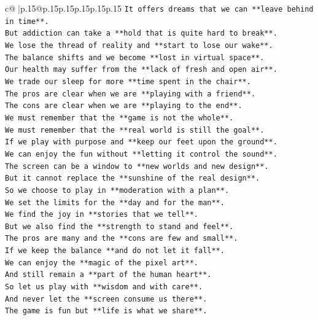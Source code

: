\documentclass{article}
\begin{document}
{\begin{supertabular}{c@{$\;$}|p{.15\linewidth}@{}p{.15\linewidth}p{.15\linewidth}p{.15\linewidth}p{.15\linewidth}p{.15\linewidth}}
{{{\texttt{It offers dreams that we can **leave behind in time**.} \\
\texttt{But addiction can take a **hold that is quite hard to break**.} \\
\texttt{We lose the thread of reality and **start to lose our wake**.} \\
\texttt{The balance shifts and we become **lost in virtual space**.} \\
\texttt{Our health may suffer from the **lack of fresh and open air**.} \\
\texttt{We trade our sleep for more **time spent in the chair**.} \\
\texttt{The pros are clear when we are **playing with a friend**.} \\
\texttt{The cons are clear when we are **playing to the end**.} \\
\texttt{We must remember that the **game is not the whole**.} \\
\texttt{We must remember that the **real world is still the goal**.} \\
\texttt{If we play with purpose and **keep our feet upon the ground**.} \\
\texttt{We can enjoy the fun without **letting it control the sound**.} \\
\texttt{The screen can be a window to **new worlds and new design**.} \\
\texttt{But it cannot replace the **sunshine of the real design**.} \\
\texttt{So we choose to play in **moderation with a plan**.} \\
\texttt{We set the limits for the **day and for the man**.} \\
\texttt{We find the joy in **stories that we tell**.} \\
\texttt{But we also find the **strength to stand and feel**.} \\
\texttt{The pros are many and the **cons are few and small**.} \\
\texttt{If we keep the balance **and do not let it fall**.} \\
\texttt{We can enjoy the **magic of the pixel art**.} \\
\texttt{And still remain a **part of the human heart**.} \\
\texttt{So let us play with **wisdom and with care**.} \\
\texttt{And never let the **screen consume us there**.} \\
\texttt{The game is fun but **life is what we share**.} \\
}}}
\end{supertabular}}
\end{document}

